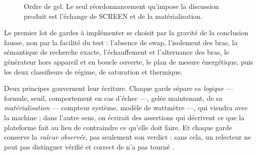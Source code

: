 \documentclass[11pt,a4paper]{article}
\begin{document}
\begin{figure}[h]
\centering
{}
\caption{Ordre de gel. Le seul réordonnancement qu'impose la discussion produit est
l'échange de SCREEN et de la matérialisation.}
\label{fig:gel}
\end{figure}

Le premier lot de gardes à implémenter se choisit par la gravité de la conclusion
fausse, non par la facilité du test : l'absence de swap, l'isolement des bras, la
sémantique de recherche exacte, l'échauffement et l'alternance des bras, le
générateur hors appareil et en boucle ouverte, le plan de mesure énergétique, puis les
deux classifieurs de régime, de saturation et thermique.

Deux principes gouvernent leur écriture. Chaque garde sépare sa \emph{logique} —
formule, seuil, comportement en cas d'échec —, gelée maintenant, de sa
\emph{matérialisation} — compteur système, modèle de wattmètre —, qui viendra avec la
machine ; dans l'autre sens, on écrirait des assertions qui décrivent ce que la
plateforme fait au lieu de contraindre ce qu'elle doit faire. Et chaque garde conserve
la \emph{valeur observée}, pas seulement son verdict : sans cela, un relecteur ne peut
pas distinguer \og vérifié et correct \fg{} de \og n'a pas tourné \fg.
\end{document}
